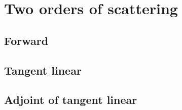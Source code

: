 %
\section{Two orders of scattering}
\label{sec:two_os}


\subsection{Forward}
\label{sec:two_os-forward}


%
\subsection{Tangent linear}
\label{sec:two_os-tangent_linear}


%
\subsection{Adjoint of tangent linear}
\label{sec:two_os-adjoint_of_tangent_linear}
